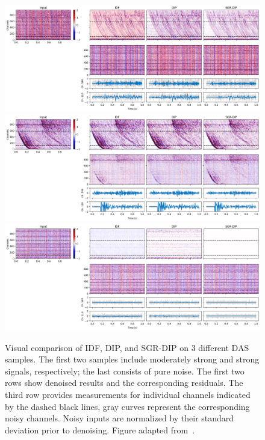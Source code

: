 \begin{figure}
    \centering
    \includegraphics[width=\textwidth]{img/fig_6.4_1.png}\\
    \vspace{10pt}
    \includegraphics[width=\textwidth]{img/fig_6.4_2.png}\\
    \vspace{10pt}
    \includegraphics[width=\textwidth]{img/fig_6.4_3.png}
    \caption{
        Visual comparison of IDF, DIP, and SGR-DIP on 3 different DAS samples.
        The first two samples include moderately strong and strong signals, respectively; the last consists of pure noise.
        The first two rows show denoised results and the corresponding residuals.
        The third row provides measurements for individual channels indicated by the dashed black lines, gray curves represent the corresponding noisy channels.
        Noisy inputs are normalized by their standard deviation prior to denoising.
        Figure adapted from~\cite{DAS-CN2S}.
    }\label{fig:FORGE}
\end{figure}

